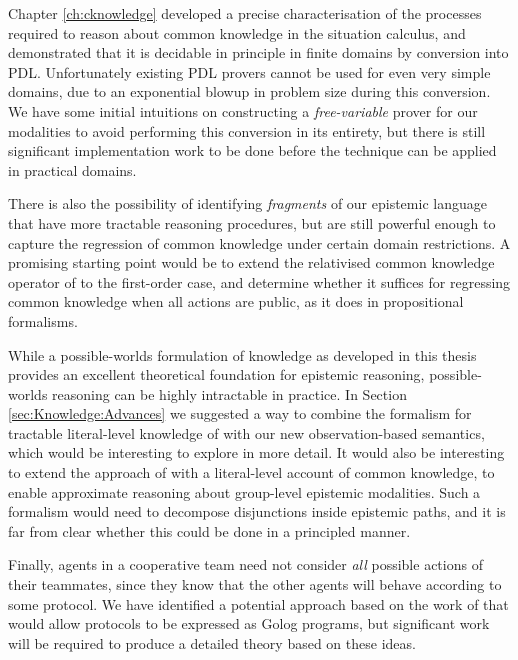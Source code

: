 Chapter \ref{ch:cknowledge} developed a precise characterisation
of the processes required to reason about common knowledge in the
situation calculus, and demonstrated that it is decidable in principle
in finite domains by conversion into PDL. Unfortunately existing PDL
provers cannot be used for even very simple domains, due to an exponential
blowup in problem size during this conversion. We have some initial
intuitions on constructing a \emph{free-variable} prover for our modalities
to avoid performing this conversion in its entirety, but there is
still significant implementation work to be done before the technique
can be applied in practical domains.

There is also the possibility of identifying \emph{fragments} of our
epistemic language that have more tractable reasoning procedures,
but are still powerful enough to capture the regression of common
knowledge under certain domain restrictions. A promising starting
point would be to extend the relativised common knowledge operator
of \citep{vanBenthem06lcc} to the first-order case, and determine
whether it suffices for regressing common knowledge when all actions
are public, as it does in propositional formalisms.

While a possible-worlds formulation of knowledge as developed in this
thesis provides an excellent theoretical foundation for epistemic
reasoning, possible-worlds reasoning can be highly intractable in
practice. In Section \ref{sec:Knowledge:Advances} we suggested a
way to combine the formalism for tractable literal-level knowledge
of \citep{demolombe00tractable_sc_belief} with our new observation-based
semantics, which would be interesting to explore in more detail. It
would also be interesting to extend the approach of \citep{demolombe00tractable_sc_belief}
with a literal-level account of common knowledge, to enable approximate
reasoning about group-level epistemic modalities. Such a formalism
would need to decompose disjunctions inside epistemic paths, and it
is far from clear whether this could be done in a principled manner.

Finally, agents in a cooperative team need not consider \emph{all}
possible actions of their teammates, since they know that the other
agents will behave according to some protocol. We have identified
a potential approach based on the work of \citep{fritz08congolog_sin_trans}
that would allow protocols to be expressed as Golog programs, but
significant work will be required to produce a detailed theory based
on these ideas.

